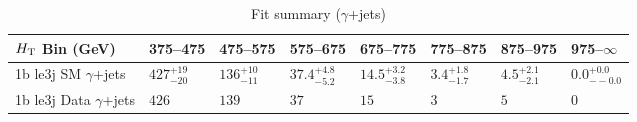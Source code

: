 \documentclass[8pt]{article}
\def\scalht{\mbox{$H_{\rm{T}}$}\xspace}
\newcommand\T{\rule{0pt}{2.6ex}}
\begin{document}
\begin{table}[ht!]
\caption{Fit summary ($\gamma$+jets)}
\label{tab:ensemble-summary}
\centering
\begin{tabular}{ llllllll }

\hline
\scalht Bin (GeV)       & 375--475                       & 475--575                       & 575--675                       & 675--775                       & 775--875                       & 875--975                       & 975--$\infty$                  \\ [1.000000ex]
\hline
1b le3j SM $\gamma$+jets\T & $427^{+19}_{-20}$              & $136^{+10}_{-11}$              & $37.4^{+4.8}_{-5.2}$           & $14.5^{+3.2}_{-3.8}$           & $3.4^{+1.8}_{-1.7}$            & $4.5^{+2.1}_{-2.1}$            & $0.0^{+0.0}_{--0.0}$           \\ 
1b le3j Data $\gamma$+jets\T & $426$                          & $139$                          & $37$                           & $15$                           & $3$                            & $5$                            & $0$                            \\ 
\hline

\end{tabular}
\end{table}
\end{document}
